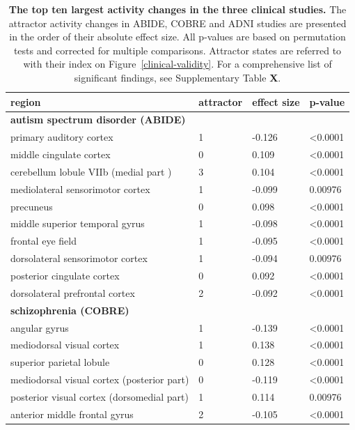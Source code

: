 \documentclass{article}
\begin{document}
\begin{table}
\centering
\caption[]{\textbf{The top ten largest activity changes in the three clinical studies.}  The attractor activity changes in ABIDE, COBRE and ADNI studies are presented in the order of their absolute effect size. All p-values are based on permutation tests and corrected for multiple comparisons. Attractor states are referred to with their index on Figure~\ref{clinical-validity}. For a comprehensive list of significant findings, see Supplementary Table \textbf{X}.}
\label{tab-clinical-results}
\begin{tabular}{p{}p{}p{}p{}}
\toprule
region & attractor & effect size & p-value \\
\hline
\textbf{autism spectrum disorder (ABIDE)} &  &  &  \\
primary auditory cortex & 1 & -0.126 & \textless 0.0001 \\
middle cingulate cortex & 0 & 0.109 & \textless 0.0001 \\
cerebellum lobule VIIb (medial part  ) & 3 & 0.104 & \textless 0.0001 \\
mediolateral sensorimotor cortex & 1 & -0.099 & 0.00976 \\
precuneus & 0 & 0.098 & \textless 0.0001 \\
middle superior temporal gyrus & 1 & -0.098 & \textless 0.0001 \\
frontal eye field & 1 & -0.095 & \textless 0.0001 \\
dorsolateral sensorimotor cortex & 1 & -0.094 & 0.00976 \\
posterior cingulate cortex & 0 & 0.092 & \textless 0.0001 \\
dorsolateral prefrontal cortex & 2 & -0.092 & \textless 0.0001 \\
\textbf{schizophrenia (COBRE)} &  &  &  \\
angular gyrus & 1 & -0.139 & \textless 0.0001 \\
mediodorsal visual cortex & 1 & 0.138 & \textless 0.0001 \\
superior parietal lobule & 0 & 0.128 & \textless 0.0001 \\
mediodorsal visual cortex (posterior part) & 0 & -0.119 & \textless 0.0001 \\
posterior visual cortex (dorsomedial part) & 1 & 0.114 & 0.00976 \\
anterior middle frontal gyrus & 2 & -0.105 & \textless 0.0001 \\

\end{tabular}
\end{table}
\end{document}
